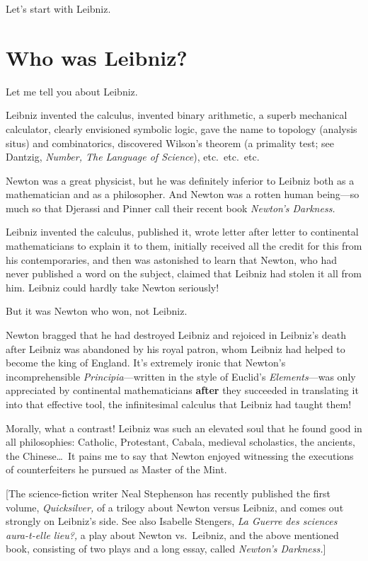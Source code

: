\documentclass[12pt]{book}
\begin{document}
Let's start with Leibniz.

\section*{Who was Leibniz?}

Let me tell you about Leibniz.
 
Leibniz invented the calculus, invented binary arithmetic, a superb mechanical
calculator, clearly envisioned symbolic logic, gave the name to topology
(analysis situs) and combinatorics, discovered Wilson's theorem (a primality test; see 
Dantzig, \emph{Number, The Language of Science}),
etc.\ etc.\ etc.
 
Newton was a great physicist, but he was definitely inferior to Leibniz both as a mathematician
and as a philosopher. And Newton was a rotten human being---so much so that 
Djerassi and Pinner call their recent book \emph{Newton's Darkness.} 
 
Leibniz invented the calculus, published it, wrote letter after letter to
continental mathematicians to explain it to them, initially received all the credit for this
from his contemporaries, and then was astonished to learn that Newton, who had
never published a word on the subject, claimed that Leibniz had stolen it all from
him. Leibniz could hardly take Newton seriously!
 
But it was Newton who won, not Leibniz.
 
Newton bragged that he had destroyed Leibniz
and rejoiced in Leibniz's death after Leibniz was abandoned by his royal patron,
whom Leibniz had helped to become the king of England. 
It's extremely ironic that Newton's incomprehensible \emph{Principia}---written
in the style of Euclid's \emph{Elements}---was only appreciated
by continental mathematicians \textbf{after} they succeeded in translating
it into that effective tool, the infinitesimal calculus that Leibniz had taught them!
 
Morally, what a contrast!
Leibniz was such an elevated soul that he found good in
all philosophies: Catholic, Protestant, Cabala, medieval scholastics, the ancients,
the Chinese\ldots\ It pains me to say that Newton enjoyed witnessing the executions
of counterfeiters he pursued as Master of the Mint.
 
{\footnotesize [The science-fiction writer Neal Stephenson has recently published the first 
volume, \emph{Quicksilver,} 
of a trilogy about Newton versus Leibniz, and comes out strongly
on Leibniz's side.
See also Isabelle Stengers, \emph{La Guerre des sciences aura-t-elle lieu?,} a
play about Newton vs.\ Leibniz, and the above mentioned book, consisting
of two plays and a long essay, called \emph{Newton's Darkness.}]}
 
\end{document}
